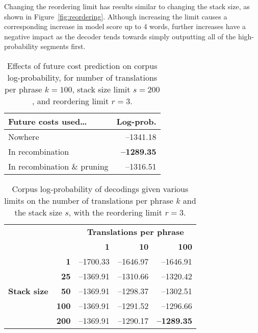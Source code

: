 \documentclass[11pt,twocolumn]{article}
\begin{document}
Changing the reordering limit has results similar to changing the stack
size, as shown in Figure~\ref{fig:reordering}.
Although increasing the limit causes a corresponding increase in model
score up to 4 words,
further increases have a negative impact as the decoder tends towards
simply outputting all of the high-probability segments first.

\begin{table}
\center
\begin{tabular}{lr}
\textbf{Future costs used\ldots} & \textbf{Log-prob.} \\
\hline
Nowhere & --1341.18 \\
In recombination & \textbf{--1289.35} \\
In recombination \& pruning & --1316.51
\end{tabular}
\caption{\label{tab:future-cost}
Effects of future cost prediction on corpus log-probability, for
number of translations per phrase $k=100$, stack size limit $s=200$,
and reordering limit $r=3$.}
\end{table}

\begin{table}
\center
\begin{tabular}{crrrr}
& & \multicolumn{3}{c}{\textbf{Translations per phrase}} \\
& & \textbf{1} & \textbf{10} & \textbf{100} \\
\hline
\multirow{5}{*}{\begin{sideways}\textbf{Stack size}\end{sideways}}
& \textbf{1}   & --1700.33 & --1646.97 & --1646.91 \\
& \textbf{25}  & --1369.91 & --1310.66 & --1320.42 \\
& \textbf{50}  & --1369.91 & --1298.37 & --1302.51 \\
& \textbf{100} & --1369.91 & --1291.52 & --1296.66 \\
& \textbf{200} & --1369.91 & --1290.17 & \textbf{--1289.35} \\
\end{tabular}
\caption{\label{tab:scores}
Corpus log-probability of decodings given various limits on the number
of translations per phrase $k$ and the stack size $s$, with the
reordering limit $r=3$.}
\end{table}
\end{document}
